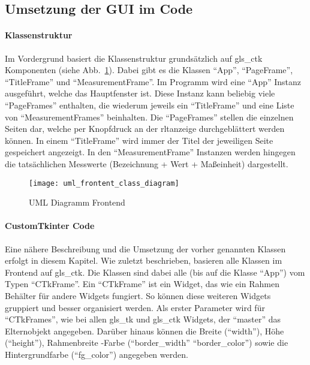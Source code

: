 \subsection{Umsetzung der GUI im Code}\label{tkintercode}
\paragraph{Klassenstruktur}
Im Vordergrund basiert die Klassenstruktur grundsätzlich auf \gls{gls_ctk} Komponenten (siehe Abb.~\ref{fig:klassenstruktur_frontend}). Dabei gibt es die Klassen \enquote{App}, \enquote{PageFrame}, \enquote{TitleFrame} und \enquote{MeasurementFrame}. Im Programm wird eine \enquote{App} Instanz ausgeführt, welche das Hauptfenster ist. Diese Instanz kann beliebig viele \enquote{PageFrames} enthalten, die wiederum jeweils ein \enquote{TitleFrame} und eine Liste von \enquote{MeasurementFrames} beinhalten. Die \enquote{PageFrames} stellen die einzelnen Seiten dar, welche per Knopfdruck an der \acs{rltanzeige} durchgeblättert werden können. In einem \enquote{TitleFrame} wird immer der Titel der jeweiligen Seite gespeichert \bzw angezeigt. In den \enquote{MeasurementFrame} Instanzen werden hingegen die tatsächlichen Messwerte (Bezeichnung + Wert + Maßeinheit) dargestellt.

\begin{figure}[H]
	\centering
	\texttt{[image: uml\_frontent\_class\_diagram]}
	\caption{UML Diagramm Frontend \label{fig:klassenstruktur_frontend}}
\end{figure}

\paragraph{CustomTkinter Code}
Eine nähere Beschreibung und die Umsetzung der vorher genannten Klassen erfolgt in diesem Kapitel. 
\newline Wie zuletzt beschrieben, basieren alle Klassen im Frontend auf \gls{gls_ctk}. Die Klassen sind dabei alle (bis auf die Klasse \enquote{App}) vom Typen \enquote{CTkFrame}. Ein \enquote{CTkFrame} ist ein Widget, das wie ein Rahmen \bzw Behälter für andere Widgets fungiert. So können diese weiteren Widgets gruppiert und besser organisiert werden. Als erster Parameter wird für \enquote{CTkFrames}, wie bei allen \gls{gls_tk} und \gls{gls_ctk} Widgets, der \enquote{master} \bzw das Elternobjekt angegeben. Darüber hinaus können die Breite (\enquote{width}), Höhe (\enquote{height}), Rahmenbreite \bzw -Farbe (\enquote{border\_width} \bzw \enquote{border\_color}) sowie die Hintergrundfarbe (\enquote{fg\_color}) angegeben werden. \cite[vgl.][]{Schimansky:o.J.}

